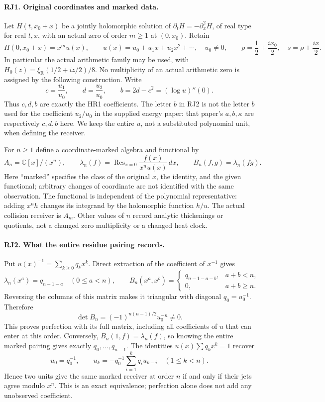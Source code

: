 \documentclass[11pt,a4paper]{article}
\theoremstyle{definition}\newtheorem{definition}[theorem]{Definition}
\begin{document}
\paragraph{RJ1. Original coordinates and marked data.}
Let $H(t,x_0+x)$ be a jointly holomorphic solution of
$\partial_tH=-\partial_x^2H$, of real type for real $t,x$, with an
actual zero of order $m\ge1$ at $(0,x_0)$. Retain
\[
 H(0,x_0+x)=x^m u(x),\qquad
 u(x)=u_0+u_1x+u_2x^2+\cdots,\quad u_0\ne0,
 \qquad \rho=\frac12+\frac{ix_0}{2},\quad s=\rho+\frac{ix}{2}.
 \tag{RJ1}
\]
In particular the actual arithmetic family may be used, with
$H_0(z)=\xi_{\mathrm R}(1/2+iz/2)/8$. No multiplicity of an
actual arithmetic zero is assigned by the following construction.
Write
\[
 c=\frac{u_1}{u_0},\qquad d=\frac{u_2}{u_0},\qquad
 b=2d-c^2=(\log u)''(0).
 \tag{RJ2}
\]
Thus $c,d,b$ are exactly the HR1 coefficients. The letter $b$ in
RJ2 is not the letter $b$ used for the coefficient $u_2/u_0$ in the
supplied energy paper: that paper's $a,b,\kappa$ are respectively
$c,d,b$ here. We keep the entire $u$, not a substituted polynomial
unit, when defining the receiver.

For $n\ge1$ define a coordinate-marked algebra and functional by
\[
 A_n=\mathbb C[x]/(x^n),\qquad
 \lambda_n(f)=\operatorname{Res}_{x=0}
          \frac{f(x)}{x^n u(x)}\,dx,\qquad
 B_n(f,g)=\lambda_n(fg).
 \tag{RJ3}
\]
Here ``marked'' specifies the class of the original $x$, the identity,
and the given functional; arbitrary changes of coordinate are not
identified with the same observation. The functional is independent
of the polynomial representative: adding $x^nh$ changes its integrand
by the holomorphic function $h/u$. The actual collision receiver is
$A_m$. Other values of $n$ record analytic thickenings or quotients,
not a changed zero multiplicity or a changed heat clock.

\paragraph{RJ2. What the entire residue pairing records.}
Put $u(x)^{-1}=\sum_{k\ge0}q_kx^k$. Direct extraction of the
coefficient of $x^{-1}$ gives
\[
 \lambda_n(x^a)=q_{n-1-a}\quad(0\le a<n),\qquad
 B_n(x^a,x^b)=
 \begin{cases}q_{n-1-a-b},&a+b<n,\\0,&a+b\ge n.\end{cases}
 \tag{RJ4}
\]
Reversing the columns of this matrix makes it triangular with diagonal
$q_0=u_0^{-1}$. Therefore
\[
 \det B_n=(-1)^{n(n-1)/2}u_0^{-n}\ne0.
 \tag{RJ5}
\]
This proves perfection with its full matrix, including all coefficients
of $u$ that can enter at this order. Conversely, $B_n(1,f)=\lambda_n(f)$,
so knowing the entire marked pairing gives exactly $q_0,\ldots,q_{n-1}$.
The identities $u(x)\sum q_kx^k=1$ recover
\[
 u_0=q_0^{-1},\qquad
 u_k=-q_0^{-1}\sum_{i=1}^k q_i u_{k-i}\quad(1\le k<n).
 \tag{RJ6}
\]
Hence two units give the same marked receiver at order $n$ if and
only if their jets agree modulo $x^n$. This is an exact equivalence;
perfection alone does not add any unobserved coefficient.
\end{document}

